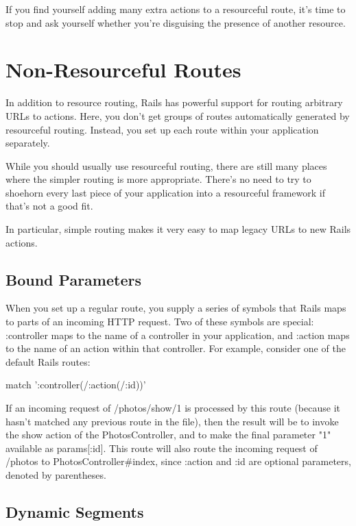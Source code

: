 \documentclass[10pt]{book}
\newenvironment{code}{%
  \scriptsize
    \verbatim
}{%
    \endverbatim
    \newline
}
\begin{document}
If you find yourself adding many extra actions to a resourceful  route, it’s time to stop and ask yourself whether you’re disguising the  presence of another resource.

\section{ Non-Resourceful Routes}

In addition to resource routing, Rails has powerful support for  routing arbitrary URLs to actions. Here, you don’t get groups of routes  automatically generated by resourceful routing. Instead, you set up each  route within your application separately.

While you should usually use resourceful routing, there are still  many places where the simpler routing is more appropriate. There’s no  need to try to shoehorn every last piece of your application into a  resourceful framework if that’s not a good fit.

In particular, simple routing makes it very easy to map legacy URLs to new Rails actions.

\subsection{ Bound Parameters}

When you set up a regular route, you supply a series of symbols that Rails maps to parts of an incoming HTTP request. Two of these symbols are special: :controller maps to the name of a controller in your application, and :action maps to the name of an action within that controller. For example, consider one of the default Rails routes:
\begin{code}
match ':controller(/:action(/:id))'
\end{code}

If an incoming request of /photos/show/1 is processed by this route (because it hasn’t matched any previous route in the file), then the result will be to invoke the show action of the PhotosController, and to make the final parameter "1" available as params[:id]. This route will also route the incoming request of /photos to PhotosController\#index, since :action and :id are optional parameters, denoted by parentheses.

\subsection{ Dynamic Segments}
\end{document}
